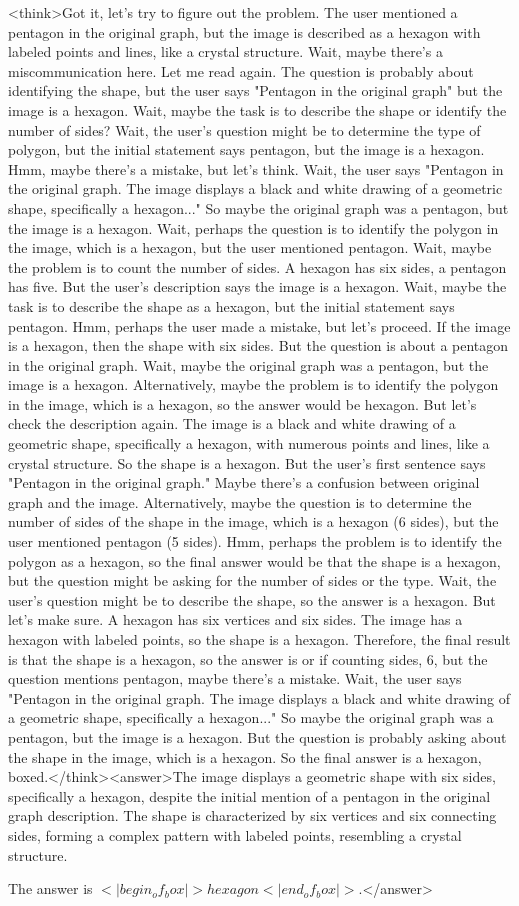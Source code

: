 <think>Got it, let's try to figure out the problem. The user mentioned a pentagon in the original graph, but the image is described as a hexagon with labeled points and lines, like a crystal structure. Wait, maybe there's a miscommunication here. Let me read again. The question is probably about identifying the shape, but the user says "Pentagon in the original graph" but the image is a hexagon. Wait, maybe the task is to describe the shape or identify the number of sides? Wait, the user's question might be to determine the type of polygon, but the initial statement says pentagon, but the image is a hexagon. Hmm, maybe there's a mistake, but let's think. Wait, the user says "Pentagon in the original graph. The image displays a black and white drawing of a geometric shape, specifically a hexagon..." So maybe the original graph was a pentagon, but the image is a hexagon. Wait, perhaps the question is to identify the polygon in the image, which is a hexagon, but the user mentioned pentagon. Wait, maybe the problem is to count the number of sides. A hexagon has six sides, a pentagon has five. But the user's description says the image is a hexagon. Wait, maybe the task is to describe the shape as a hexagon, but the initial statement says pentagon. Hmm, perhaps the user made a mistake, but let's proceed. If the image is a hexagon, then the shape with six sides. But the question is about a pentagon in the original graph. Wait, maybe the original graph was a pentagon, but the image is a hexagon. Alternatively, maybe the problem is to identify the polygon in the image, which is a hexagon, so the answer would be hexagon. But let's check the description again. The image is a black and white drawing of a geometric shape, specifically a hexagon, with numerous points and lines, like a crystal structure. So the shape is a hexagon. But the user's first sentence says "Pentagon in the original graph." Maybe there's a confusion between original graph and the image. Alternatively, maybe the question is to determine the number of sides of the shape in the image, which is a hexagon (6 sides), but the user mentioned pentagon (5 sides). Hmm, perhaps the problem is to identify the polygon as a hexagon, so the final answer would be that the shape is a hexagon, but the question might be asking for the number of sides or the type. Wait, the user's question might be to describe the shape, so the answer is a hexagon. But let's make sure. A hexagon has six vertices and six sides. The image has a hexagon with labeled points, so the shape is a hexagon. Therefore, the final result is that the shape is a hexagon, so the answer is  or if counting sides, 6, but the question mentions pentagon, maybe there's a mistake. Wait, the user says "Pentagon in the original graph. The image displays a black and white drawing of a geometric shape, specifically a hexagon..." So maybe the original graph was a pentagon, but the image is a hexagon. But the question is probably asking about the shape in the image, which is a hexagon. So the final answer is a hexagon, boxed.</think><answer>The image displays a geometric shape with six sides, specifically a hexagon, despite the initial mention of a pentagon in the original graph description. The shape is characterized by six vertices and six connecting sides, forming a complex pattern with labeled points, resembling a crystal structure.  

The answer is \(<|begin_of_box|>hexagon<|end_of_box|>\).</answer>